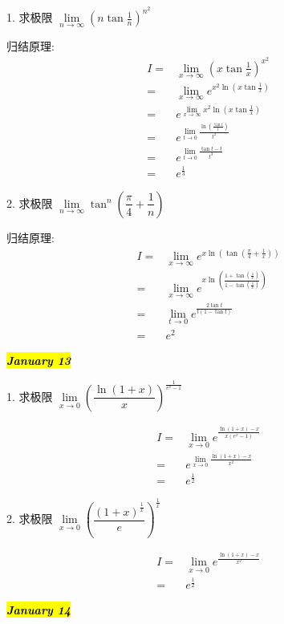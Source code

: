 1. 求极限 $\lim\limits_{n\to \infty}\left(n\tan\frac{1}{n}\right)^{n^{2}}$
\begin{solution}
	
	归结原理:
	\begin{align*}
		I = & \lim\limits_{x\to \infty}\left(x\tan\frac{1}{x}\right)^{x^{2}}\\
		  = & \lim\limits_{x\to \infty}e^{x^{2}\ln(x\tan\frac{1}{x})}\\
		  = & e^{\lim\limits_{x\to \infty}x^{2}\ln(x\tan\frac{1}{x})}\\
		  = & e^{\lim\limits_{t\to 0}\frac{\ln(\frac{\tan t}{t})}{t^{2}}}\\
		  = & e^{\lim\limits_{t\to 0}\frac{\tan t-t}{t^{3}}}\\
		  = & e^{\frac{1}{3}}
	\end{align*}
\end{solution}

2. 求极限 $\lim\limits_{n\to \infty}\tan^{n}\left( \dfrac{\pi}{4}+\dfrac{1}{n}\right)$
\begin{solution}
	
	归结原理:
	\begin{align*}
		I = & \lim\limits_{x\to \infty}e^{x\ln(\tan(\frac{\pi}{4}+\frac{1}{x}))}\\
		  = & \lim\limits_{x\to \infty}e^{x\ln(\frac{1+\tan(\frac{1}{x})}{1-\tan(\frac{1}{x})})}\\
		  = & \lim\limits_{t\to 0}e^{\frac{2\tan t}{t(1-\tan t)}}\\
		  = & e^{2}
	\end{align*}
\end{solution}
\hl{\textbf{\textit{January 13}}}

1. 求极限 $\lim\limits_{x\to 0}\left( \dfrac{\ln(1+x)}{x}\right)^{\frac{1}{e^{x}-1}}$
\begin{solution}

	\begin{align*}
		I = & \lim\limits_{x\to 0}e^{\frac{\ln(1+x)-x}{x(e^{x}-1)}}\\
		  = & e^{\lim\limits_{x\to 0}\frac{\ln(1+x)-x}{x^{2}}}\\
		  = & e^{\frac{1}{2}}
	\end{align*}
\end{solution}

2. 求极限 $\lim\limits_{x\to 0}\left( \dfrac{(1+x)^{\frac{1}{x}}}{e}\right)^{\frac{1}{x}}$
\begin{solution}

	\begin{align*}
		I = & \lim\limits_{x\to 0}e^{\frac{\ln(1+x)-x}{x^{2}}}\\
		  = & e^{\frac{1}{2}}
	\end{align*}
\end{solution}
\hl{\textbf{\textit{January 14}}}

